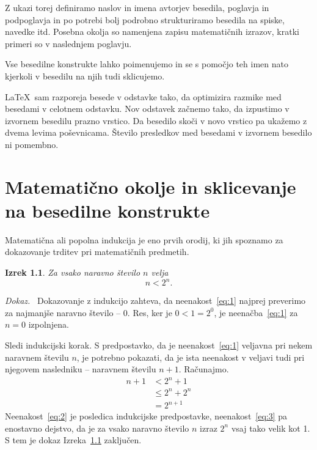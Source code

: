 \documentclass[a4paper, 12pt]{book}
\newtheorem{izrek}{Izrek}[chapter]
\newenvironment{dokaz}{\emph{Dokaz.}\ }{\hspace{\fill}{$\Box$}}
\begin{document}
Z ukazi torej definiramo naslov in imena avtorjev besedila, poglavja in podpoglavja in po potrebi bolj podrobno strukturiramo besedila na spiske, navedke itd.
Posebna okolja so namenjena zapisu matematičnih izrazov, kratki primeri so v naslednjem poglavju.

Vse besedilne konstrukte lahko poimenujemo in se s pomočjo teh imen nato  kjerkoli v besedilu na njih  tudi sklicujemo.

\LaTeX\ sam razporeja besede v odstavke tako, da optimizira razmike med besedami v celotnem odstavku.
Nov odstavek začnemo tako, da izpustimo v izvornem besedilu prazno vrstico. Da besedilo skoči v novo vrstico pa ukažemo z dvema levima poševnicama.
Število presledkov med besedami v izvornem besedilo ni pomembno.


\chapter{Matematično okolje in sklicevanje na besedilne konstrukte}
\label{ch1}



Matematična ali popolna indukcija je eno prvih orodij, ki jih spoznamo za dokazovanje trditev pri matematičnih predmetih.
\begin{izrek}
\label{iz:1}
Za vsako naravno število $n$ velja
\begin{equation}
n < 2^n.
\label{eq:1}
\end{equation}
\end{izrek}
\begin{dokaz}
Dokazovanje z indukcijo zahteva, da neenakost~\eqref{eq:1} najprej preverimo za najmanjše naravno število -- $0$. 
Res, ker je $0 < 1 = 2^0$, je neenačba~\eqref{eq:1} za $n=0$ izpolnjena.

Sledi indukcijski korak. S predpostavko, da je neenakost~\eqref{eq:1} veljavna pri nekem naravnem številu $n$, je potrebno pokazati, da je ista neenakost v veljavi tudi pri njegovem nasledniku -- naravnem številu $n+1$. 
Računajmo.
\begin{align}
n+1 & < 2^n + 1       \label{eq:2}\\
       & \le 2^n + 2^n \label{eq:3}\\
       & = 2^{n+1}       \nonumber
\end{align}
Neenakost~\eqref{eq:2} je posledica indukcijske predpostavke, neenakost~\eqref{eq:3} pa enostavno dejstvo, da je za vsako naravno število $n$ izraz $2^n$ vsaj tako velik kot 1. 
S tem je dokaz Izreka~\ref{iz:1} zaključen.
\end{dokaz}
\end{document}
